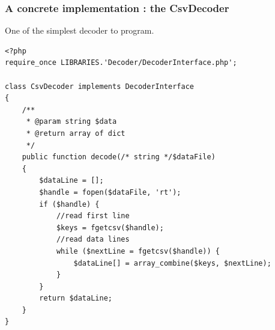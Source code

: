 \documentclass[a4paper, 11pt]{article}
\begin{document}
\subsubsection{A concrete implementation : the CsvDecoder}
One of the simplest decoder to program.
\label{lst:concrete}
\begin{lstlisting}
<?php
require_once LIBRARIES.'Decoder/DecoderInterface.php';

class CsvDecoder implements DecoderInterface
{
	/**
	 * @param string $data
	 * @return array of dict
	 */
	public function decode(/* string */$dataFile)
	{
		$dataLine = [];
		$handle = fopen($dataFile, 'rt');
		if ($handle) {
			//read first line
			$keys = fgetcsv($handle);
			//read data lines
			while ($nextLine = fgetcsv($handle)) {
				$dataLine[] = array_combine($keys, $nextLine);
			}
		}
		return $dataLine;
	}
}
\end{lstlisting}
\end{document}
